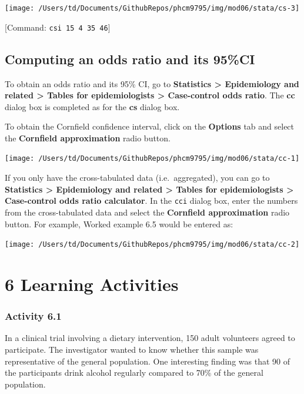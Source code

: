 \documentclass[
]{memoir}
\begin{document}
\texttt{[image: /Users/td/Documents/GithubRepos/phcm9795/img/mod06/stata/cs-3]}

{[}Command: \texttt{csi\ 15\ 4\ 35\ 46}{]}

\hypertarget{computing-an-odds-ratio-and-its-95ci}{%
\section{Computing an odds ratio and its 95\%CI}\label{computing-an-odds-ratio-and-its-95ci}}

To obtain an odds ratio and its 95\% CI, go to \textbf{Statistics \textgreater{} Epidemiology and related \textgreater{} Tables for epidemiologists \textgreater{} Case-control odds ratio}. The \textbf{cc} dialog box is completed as for the \textbf{cs} dialog box.

To obtain the Cornfield confidence interval, click on the \textbf{Options} tab and select the \textbf{Cornfield approximation} radio button.

\texttt{[image: /Users/td/Documents/GithubRepos/phcm9795/img/mod06/stata/cc-1]}

If you only have the cross-tabulated data (i.e.~aggregated), you can go to \textbf{Statistics \textgreater{} Epidemiology and related \textgreater{} Tables for epidemiologists \textgreater{} Case-control odds ratio calculator}. In the \texttt{cci} dialog box, enter the numbers from the cross-tabulated data and select the \textbf{Cornfield approximation} radio button. For example, Worked example 6.5 would be entered as:

\texttt{[image: /Users/td/Documents/GithubRepos/phcm9795/img/mod06/stata/cc-2]}

\hypertarget{learning-activities-5}{%
\chapter*{\texorpdfstring{\textbf{6} Learning Activities}{6 Learning Activities}}\label{learning-activities-5}}

\hypertarget{activity-6.1}{%
\subsection*{Activity 6.1}\label{activity-6.1}}

In a clinical trial involving a dietary intervention, 150 adult volunteers agreed to participate. The investigator wanted to know whether this sample was representative of the general population. One interesting finding was that 90 of the participants drink alcohol regularly compared to 70\% of the general population.
\end{document}
